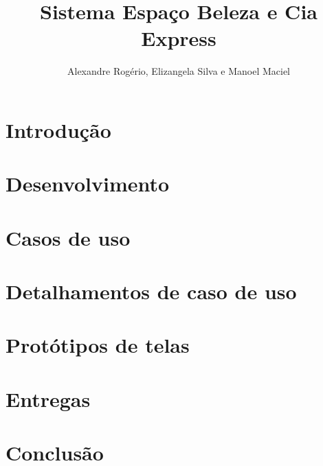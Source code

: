 \documentclass{article}
\begin{document}
	\title{\textbf{{\Huge Sistema Espaço Beleza e Cia Express}}}
	\author{Alexandre Rogério, Elizangela Silva e Manoel Maciel}
	\maketitle
	\thispagestyle{empty}
	\newpage
	
	\setcounter{page}{1}
	\tableofcontents
	\newpage
	
	\listoffigures
	\newpage
	
	\listoftables
	\newpage
	
	\setcounter{page}{1}
	
	\section{Introdução}
	
	\newpage
	\section{Desenvolvimento}
	
	\newpage
	\section{Casos de uso}
	
	\newpage
	\section{Detalhamentos de caso de uso}
	
	\newpage
	\section{Protótipos de telas}
	
	\newpage
	\section{Entregas}
	
	\section{Conclusão}
	
\end{document}
